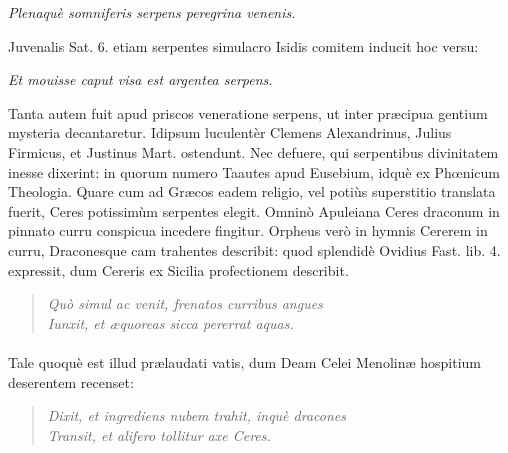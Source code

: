 \documentclass[a4paper, 11pt, oneside, polutonikogreek, latin]{article}
\begin{document}
\emph{Plenaquè somniferis serpens peregrina venenis.}

Juvenalis Sat. 6. etiam serpentes simulacro Isidis comitem inducit hoc versu:

\emph{Et mouisse caput visa est argentea serpens.}

Tanta autem fuit apud priscos veneratione serpens, ut inter præcipua gentium mysteria decantaretur. Idipsum luculentèr Clemens Alexandrinus, Julius Firmicus, et Justinus Mart. ostendunt. Nec defuere, qui serpentibus divinitatem inesse dixerint: in quorum numero Taautes apud Eusebium, idquè ex Phœnicum Theologia. Quare cum ad Græcos eadem religio, vel potiùs superstitio translata fuerit, Ceres potissimùm serpentes elegit. Omninò Apuleiana Ceres draconum in pinnato curru conspicua incedere fingitur. Orpheus verò in hymnis Cererem in curru, Draconesque cam trahentes describit: quod splendidè Ovidius Fast. lib. 4. expressit, dum Cereris ex Sicilia profectionem describit.
\begin{quote}
\emph{Quò simul ac venit, frenatos curribus angues}\\
\hspace*{10mm}\emph{Iunxit, et æquoreas sicca pererrat aquas.}\\
\end{quote}
\paragraph{}
Tale quoquè est illud prælaudati vatis, dum Deam Celei Menolinæ hospitium deserentem recenset:
\begin{quote}
\emph{Dixit, et ingrediens nubem trahit, inquè dracones}\\
\hspace*{10mm}\emph{Transit, et alifero tollitur axe Ceres.}\\
\end{quote}
\end{document}
